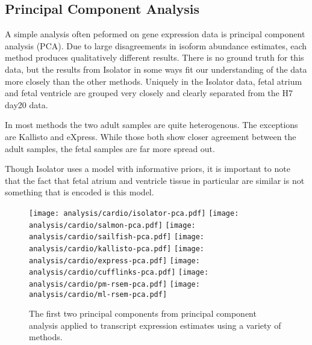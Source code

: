 \documentclass{article}
\begin{document}
\subsection{Principal Component Analysis}

A simple analysis often peformed on gene expression data is principal component
analysis (PCA). Due to large disagreements in isoform abundance estimates, each
method produces qualitatively different results. There is no ground truth for
this data, but the results from Isolator in some ways fit our understanding of
the data more closely than the other methods. Uniquely in the Isolator data,
fetal atrium and fetal ventricle are grouped very closely and clearly separated
from the H7 day20 data.

In most methods the two adult samples are quite heterogenous. The exceptions are
Kallisto and eXpress. While those both show closer agreement between the adult
samples, the fetal samples are far more spread out.

Though Isolator uses a model with informative priors, it is important to note
that the fact that fetal atrium and ventricle tissue in particular are similar
is not something that is encoded is this model.

\begin{figure}
\texttt{[image: analysis/cardio/isolator-pca.pdf]}
\texttt{[image: analysis/cardio/salmon-pca.pdf]}
\texttt{[image: analysis/cardio/sailfish-pca.pdf]}
\texttt{[image: analysis/cardio/kallisto-pca.pdf]}
\texttt{[image: analysis/cardio/express-pca.pdf]}
\texttt{[image: analysis/cardio/cufflinks-pca.pdf]}
\texttt{[image: analysis/cardio/pm-rsem-pca.pdf]}
\texttt{[image: analysis/cardio/ml-rsem-pca.pdf]}
\caption{The first two principal components from principal component analysis
applied to transcript expression estimates using a variety of methods.}
\end{figure}
\end{document}
